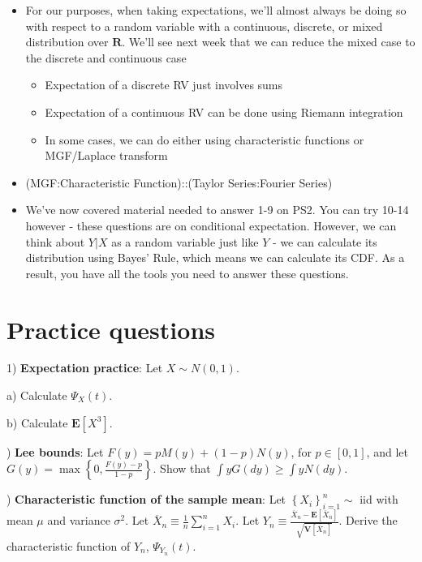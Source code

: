 \documentclass[12pt,english]{article}
\begin{document}
\begin{itemize}
	\item For our purposes, when taking expectations, we'll almost always be doing so with respect to a random variable with a continuous, discrete, or mixed distribution over $\mathbf{R}$. We'll see next week that we can reduce the mixed case to the discrete and continuous case
	\begin{itemize}
		\item Expectation of a discrete RV just involves sums
		\item Expectation of a continuous RV can be done using Riemann integration
		\item In some cases, we can do either using characteristic functions or MGF/Laplace transform
	\end{itemize}
	\item (MGF:Characteristic Function)::(Taylor Series:Fourier Series)
	\item We've now covered material needed to answer 1-9 on PS2. You can try 10-14 however - these questions are on conditional expectation. However, we can think about $Y | X$ as a random variable just like $Y$ - we can calculate its distribution using Bayes' Rule, which means we can calculate its CDF. As a result, you have all the tools you need to answer these questions.
\end{itemize}

\section{Practice questions}

1) \textbf{Expectation practice}: Let $X \sim N(0, 1)$.

\noindent
a) Calculate $\Psi_{X}(t)$.

\noindent
b) Calculate $\mathbf{E}[X^{3}]$.

\vspace{1em}
) \textbf{Lee bounds}: Let $F(y) = pM(y) + (1 - p)N(y)$, for $p \in [0, 1]$, and let $G(y) = \max \left\{ 0, \frac{F(y) - p}{1 - p} \right\}$. Show that $\int y G(dy) \geq \int y N(dy)$.

\vspace{1em}
) \textbf{Characteristic function of the sample mean}: Let $\left\{ X_{i} \right\}_{i=1}^{n} \sim$ iid with mean $\mu$ and variance $\sigma^{2}$. Let $\overline{X}_{n} \equiv \frac{1}{n} \sum_{i=1}^{n} X_{i}$. Let $Y_{n} \equiv \frac{\overline{X}_{n} - \mathbf{E} \left[\overline{X}_{n} \right]}{\sqrt{\mathbf{V} \left[ \overline{X}_{n} \right]}}$. Derive the characteristic function of $Y_{n}$, $\Psi_{Y_{n}}(t)$.
\end{document}
